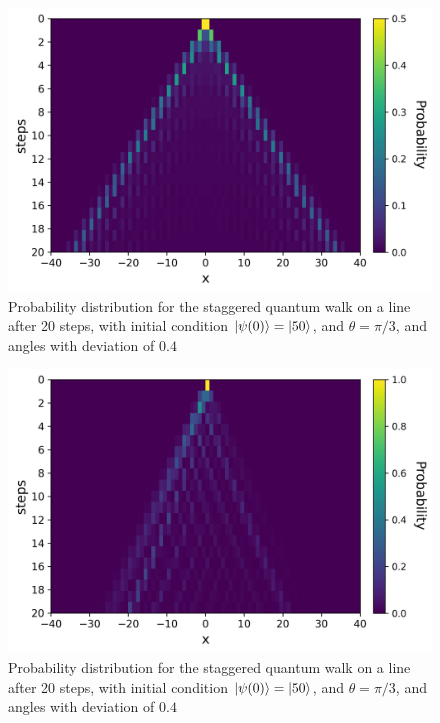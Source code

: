 \documentclass[11pt]{article}
\theoremstyle{plain}
\begin{document}
\begin{figure}[!h]
	\centering
	\includegraphics[scale=0.70]{img/Experiments/sqw_N121_t20_thetapi3-pi3_init0-1.png}
	\caption{Probability distribution for the staggered quantum walk on a line after 20 steps, with initial condition $\ket{\psi(0)}=\ket{50}$, and $\theta = \pi/3$, and angles with deviation of $0.4$} 
	\label{fig:stagQWSimulMultTheta}
\end{figure}\par

\begin{figure}[!h]
	\centering
	\includegraphics[scale=0.70]{img/Experiments/sqw_N121_t20_thetapi4-pi5_init0.png}
	\caption{Probability distribution for the staggered quantum walk on a line after 20 steps, with initial condition $\ket{\psi(0)}=\ket{50}$, and $\theta = \pi/3$, and angles with deviation of $0.4$} 
	\label{fig:stagQWSimulMultTheta}
\end{figure}\par
\end{document}
